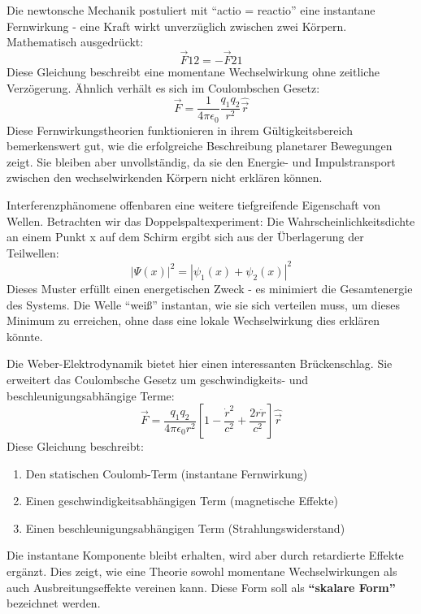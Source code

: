 Die newtonsche Mechanik postuliert mit \enquote{actio = reactio} eine instantane Fernwirkung - eine Kraft wirkt unverzüglich zwischen zwei Körpern. Mathematisch ausgedrückt:
\begin{equation}
    \vec{F}{12} = -\vec{F}{21}
\end{equation}
Diese Gleichung beschreibt eine momentane Wechselwirkung ohne zeitliche Verzögerung. Ähnlich verhält es sich im Coulombschen Gesetz:
\begin{equation}
    \vec{F} = \frac{1}{4\pi\epsilon_0}\frac{q_1q_2}{r^2}\hat{\vec{r}}
\end{equation}
Diese Fernwirkungstheorien funktionieren in ihrem Gültigkeitsbereich bemerkenswert gut, wie die erfolgreiche Beschreibung planetarer Bewegungen zeigt. Sie bleiben aber unvollständig,
da sie den Energie- und Impulstransport zwischen den wechselwirkenden Körpern nicht erklären können.

Interferenzphänomene offenbaren eine weitere tiefgreifende Eigenschaft von Wellen. Betrachten wir das Doppelspaltexperiment: Die Wahrscheinlichkeitsdichte an einem Punkt x auf dem
Schirm ergibt sich aus der Überlagerung der Teilwellen:
\begin{equation}
    |\Psi(x)|^2 = |\psi_1(x) + \psi_2(x)|^2
\end{equation}
Dieses Muster erfüllt einen energetischen Zweck - es minimiert die Gesamtenergie des Systems. Die Welle \enquote{weiß} instantan, wie sie sich verteilen muss, um dieses Minimum zu erreichen,
ohne dass eine lokale Wechselwirkung dies erklären könnte.

Die Weber-Elektrodynamik bietet hier einen interessanten Brückenschlag. Sie erweitert das Coulombsche Gesetz um geschwindigkeits- und beschleunigungsabhängige Terme:
\begin{equation}
    \label{eq:weber_em_skalar}
    \vec{F} = \frac{q_1q_2}{4\pi\epsilon_0r^2}\left[1 - \frac{\dot{r}^2}{c^2} + \frac{2r\ddot{r}}{c^2}\right]\hat{\vec{r}}
\end{equation}
Diese Gleichung beschreibt:
\begin{enumerate}
    \item Den statischen Coulomb-Term (instantane Fernwirkung)
    \item Einen geschwindigkeitsabhängigen Term (magnetische Effekte)
    \item Einen beschleunigungsabhängigen Term (Strahlungswiderstand)
\end{enumerate}
Die instantane Komponente bleibt erhalten, wird aber durch retardierte Effekte ergänzt. Dies zeigt, wie eine Theorie sowohl momentane Wechselwirkungen als auch Ausbreitungseffekte vereinen kann.
Diese Form soll als \textbf{\enquote{skalare Form}} bezeichnet werden.

